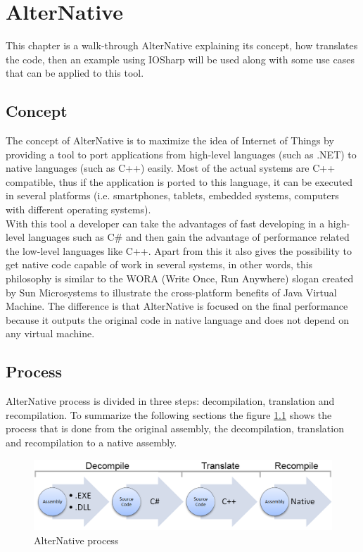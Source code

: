 \chapter{AlterNative}\label{C:AlterNative}
This chapter is a walk-through AlterNative explaining its concept, how translates the code, then an example using IOSharp will be used along with some use cases that can be applied to this tool.
\section{Concept}\label{S:AN-Concept}
The concept of AlterNative is to maximize the idea of Internet of Things by providing a tool to port applications from high-level languages (such as .NET) to native languages (such as C++) easily. Most of the actual systems are C++ compatible, thus if the application is ported to this language, it can be executed in several platforms (i.e. smartphones, tablets, embedded systems, computers with different operating systems).
\\
With this tool a developer can take the advantages of fast developing in a high-level languages such as C\# and then gain the advantage of performance related the low-level languages like C++. Apart from this it also gives the possibility to get native code capable of work in several systems, in other words, this philosophy is similar to the WORA (Write Once, Run Anywhere) slogan created by Sun Microsystems to illustrate the cross-platform benefits of Java Virtual Machine. The difference is that AlterNative is focused on the final performance because it outputs the original code in native language and does not depend on any virtual machine.
\section{Process}\label{S:AN-Process}
AlterNative process is divided in three steps: decompilation, translation and recompilation.
To summarize the following sections the figure \ref{fig:AN-Process} shows the process that is done from the original assembly, the decompilation, translation and recompilation to a native assembly.
\begin{figure}[H]\begin{center}
 \centering
  \captionsetup{justification=centering}
  \includegraphics[width=1\textwidth]{pictures/alternative/process}
  \caption{AlterNative process\label{fig:AN-Process}}
\end{center}\end{figure}


